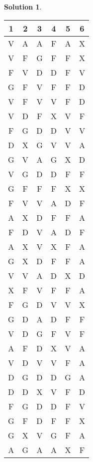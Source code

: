 \documentclass[11pt]{article}
\theoremstyle{definition}\newtheorem{definition}{Definition}
\theoremstyle{definition}\newtheorem{question}{Question}
\theoremstyle{definition}\newtheorem*{solution}{Solution}
\begin{document}
\begin{solution}
    \begin{center}
        \begin{tabular}{cccccc}
            1 & 2 & 3 & 4 & 5 & 6 \\ \hline
            V & A & A & F & A & X \\
            V & F & G & F & F & X \\
            F & V & D & D & F & V \\
            G & F & V & F & F & D \\
            V & F & V & V & F & D \\
            V & D & F & X & V & F \\
            F & G & D & D & V & V \\
            D & X & G & V & V & A \\
            G & V & A & G & X & D \\
            V & G & D & D & F & F \\
            G & F & F & F & X & X \\
            F & V & V & A & D & F \\
            A & X & D & F & F & A \\
            F & D & V & A & D & F \\
            A & X & V & X & F & A \\
            G & X & D & F & F & A \\
            V & V & A & D & X & D \\
            X & F & V & F & F & A \\
            F & G & D & V & V & X \\
            G & D & A & D & F & F \\
            V & D & G & F & V & F \\
            A & F & D & X & V & A \\
            V & D & V & V & F & A \\
            D & G & D & D & G & A \\
            D & D & X & V & F & D \\
            F & G & D & D & F & V \\
            G & F & D & F & F & X \\
            G & X & V & G & F & A \\
            A & G & A & A & X & F \\
        \end{tabular}
    \end{center}


\end{solution}
\end{document}
